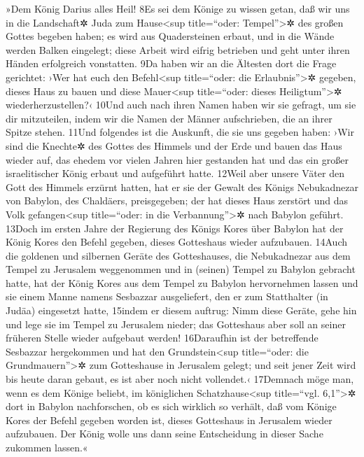 »Dem König Darius alles Heil! 8Es sei dem Könige zu wissen getan, daß
wir uns in die Landschaft✲ Juda zum Hause\textless sup title=``oder:
Tempel''\textgreater✲ des großen Gottes begeben haben; es wird aus
Quadersteinen erbaut, und in die Wände werden Balken eingelegt; diese
Arbeit wird eifrig betrieben und geht unter ihren Händen erfolgreich
vonstatten. 9Da haben wir an die Ältesten dort die Frage gerichtet: ›Wer
hat euch den Befehl\textless sup title=``oder: die
Erlaubnis''\textgreater✲ gegeben, dieses Haus zu bauen und diese
Mauer\textless sup title=``oder: dieses Heiligtum''\textgreater✲
wiederherzustellen?‹ 10Und auch nach ihren Namen haben wir sie gefragt,
um sie dir mitzuteilen, indem wir die Namen der Männer aufschrieben, die
an ihrer Spitze stehen. 11Und folgendes ist die Auskunft, die sie uns
gegeben haben: ›Wir sind die Knechte✲ des Gottes des Himmels und der
Erde und bauen das Haus wieder auf, das ehedem vor vielen Jahren hier
gestanden hat und das ein großer israelitischer König erbaut und
aufgeführt hatte. 12Weil aber unsere Väter den Gott des Himmels erzürnt
hatten, hat er sie der Gewalt des Königs Nebukadnezar von Babylon, des
Chaldäers, preisgegeben; der hat dieses Haus zerstört und das Volk
gefangen\textless sup title=``oder: in die Verbannung''\textgreater✲
nach Babylon geführt. 13Doch im ersten Jahre der Regierung des Königs
Kores über Babylon hat der König Kores den Befehl gegeben, dieses
Gotteshaus wieder aufzubauen. 14Auch die goldenen und silbernen Geräte
des Gotteshauses, die Nebukadnezar aus dem Tempel zu Jerusalem
weggenommen und in (seinen) Tempel zu Babylon gebracht hatte, hat der
König Kores aus dem Tempel zu Babylon hervornehmen lassen und sie einem
Manne namens Sesbazzar ausgeliefert, den er zum Statthalter (in Judäa)
eingesetzt hatte, 15indem er diesem auftrug: Nimm diese Geräte, gehe hin
und lege sie im Tempel zu Jerusalem nieder; das Gotteshaus aber soll an
seiner früheren Stelle wieder aufgebaut werden! 16Daraufhin ist der
betreffende Sesbazzar hergekommen und hat den Grundstein\textless sup
title=``oder: die Grundmauern''\textgreater✲ zum Gotteshause in
Jerusalem gelegt; und seit jener Zeit wird bis heute daran gebaut, es
ist aber noch nicht vollendet.‹ 17Demnach möge man, wenn es dem Könige
beliebt, im königlichen Schatzhause\textless sup title=``vgl.
6,1''\textgreater✲ dort in Babylon nachforschen, ob es sich wirklich so
verhält, daß vom Könige Kores der Befehl gegeben worden ist, dieses
Gotteshaus in Jerusalem wieder aufzubauen. Der König wolle uns dann
seine Entscheidung in dieser Sache zukommen lassen.«


